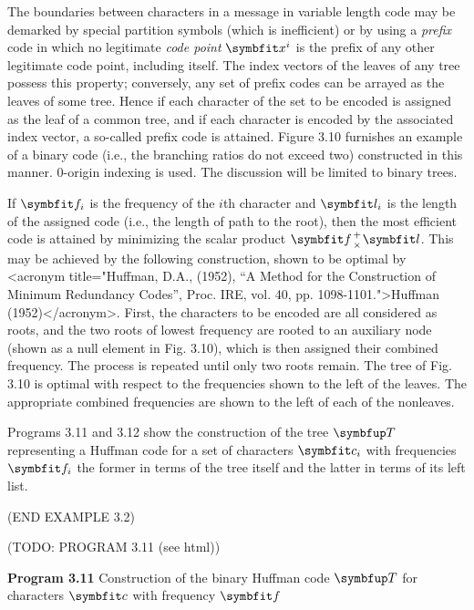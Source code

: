 \par The boundaries between characters in a message in variable length code may be demarked by special partition symbols (which is inefficient) or by using a \textit{prefix} code in which no legitimate \textit{code point} $\vect{x}^i$ is the prefix of any other legitimate code point, including itself. The index vectors of the leaves of any tree possess this property; conversely, any set of prefix codes can be arrayed as the leaves of some tree. Hence if each character of the set to be encoded is assigned as the leaf of a common tree, and if each character is encoded by the associated index vector, a so-called prefix code is attained. Figure 3.10 furnishes an example of a binary code (i.e., the branching ratios do not exceed two) constructed in this manner. 0-origin indexing is used. The discussion will be limited to binary trees.

\par If $\vect{f}_i$ is the frequency of the $i$th character and $\vect{l}_i$ is the length of the assigned code (i.e., the length of path to the root), then the most efficient code is attained by minimizing the scalar product $\vect{f} {+ \atop \times} \vect{l}$. This may be achieved by the following construction, shown to be optimal by <acronym title="Huffman, D.A., (1952), “A Method for the Construction of Minimum Redundancy Codes”, Proc. IRE, vol. 40, pp. 1098-1101.">Huffman (1952)</acronym>. First, the characters to be encoded are all considered as roots, and the two roots of lowest frequency are rooted to an auxiliary node (shown as a null element in Fig. 3.10), which is then assigned their combined frequency. The process is repeated until only two roots remain. The tree of Fig. 3.10 is optimal with respect to the frequencies shown to the left of the leaves. The appropriate combined frequencies are shown to the left of each of the nonleaves.

\par Programs 3.11 and 3.12 show the construction of the tree $\tree{T}$ representing a Huffman code for a set of characters $\vect{c}_i$ with frequencies $\vect{f}_i$ the former in terms of the tree itself and the latter in terms of its left list.

\par (END EXAMPLE 3.2)

\par (TODO: PROGRAM 3.11 (see html))

\par \textbf{Program 3.11} Construction of the binary Huffman code $\tree{T}$ for characters $\vect{c}$ with frequency $\vect{f}$

